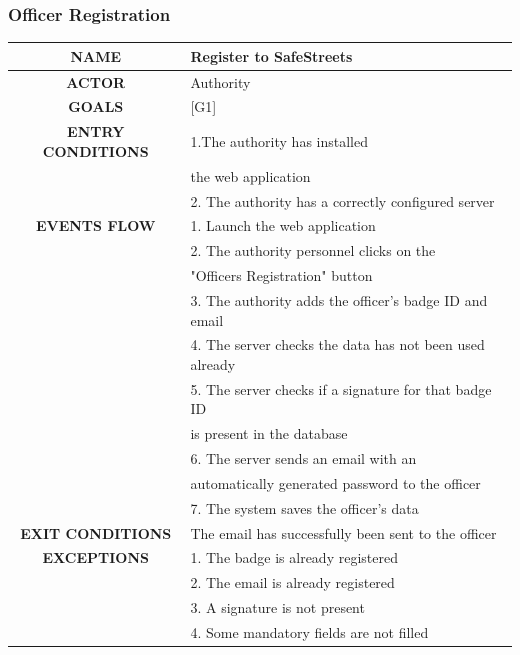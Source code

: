 \documentclass[12pt,a4paper]{article}
\begin{document}
\subsubsection{Officer Registration}
		\begin{center}
			\begin{tabular}{| c | l |}
				\hline
				\textbf{NAME} & Register to SafeStreets \\
				\hline
				\textbf{ACTOR} & Authority \\
				\hline
				\textbf{GOALS} & [G1] \\
				\hline
				\textbf{ENTRY CONDITIONS} &1.The authority has installed \\
				&	the web application \\
				&2. The authority has a correctly configured server \\ \hline
				\textbf{EVENTS FLOW}  &
				1. Launch the web application\\
				&2. The authority personnel clicks on the \\
				& "Officers Registration" button \\
				&3. The authority adds the officer's badge ID and email\\
				&4. The server checks the data has not been used already \\
				&5. The server checks if a signature for that badge ID \\
				& is present in the database \\
				&6. The server sends an email with an \\
				& automatically generated password to the officer\\
				&7. The system saves the officer's data\\
				\hline
				\textbf{EXIT CONDITIONS}  & The email has successfully been sent to the officer\\ \hline
				\textbf{EXCEPTIONS} &
				1. The badge is already registered\\
				&2. The email is already registered\\
				&3. A signature is not present\\
				&4. Some mandatory fields are not filled\\
				\hline
			\end{tabular}
		\end{center}
\newpage
\end{document}

